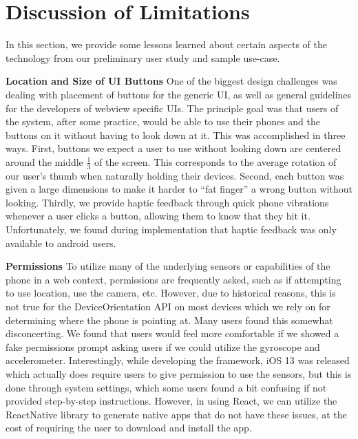 \section{Discussion of Limitations}\label{chap04:limitations}

In this section, we provide some lessons learned about certain
aspects of the technology from our preliminary user study and
sample use-case.

\textbf{Location and Size of UI Buttons} One of the biggest design challenges
was dealing with placement of
buttons for the generic UI, as well as general guidelines for the
developers of webview specific UIs. The principle goal was that
users of the system, after some practice, would be able to use
their phones and the buttons on it without having to look down
at it. This was accomplished in three ways. First, buttons we expect a
user to use without looking down are centered around the middle
$\frac{1}{3}$ of the screen. This corresponds to the average rotation
of our user's thumb when naturally holding their devices. Second,
each button was given a large dimensions to make it harder to ``fat
finger'' a wrong button without looking. Thirdly, we provide haptic
feedback through quick phone vibrations whenever a user clicks a
button, allowing them to know that they hit it. Unfortunately, we
found during implementation that haptic feedback was only available
to android users.

\textbf{Permissions} To utilize many of the underlying sensors or
capabilities of the phone in a web context, permissions are frequently
asked, such as if attempting to use location, use the camera, etc. However,
due to historical reasons, this is not true for the DeviceOrientation
API on most devices which we rely on for determining where the phone
is pointing at. Many users found this somewhat disconcerting. We
found that users would feel more comfortable if we showed a fake
permissions prompt asking users if we could utilize the gyroscope
and accelerometer. Interestingly, while developing the framework,
iOS 13 was released which actually does require users to give
permission to use the sensors, but this is done through system
settings, which some users found a bit confusing if not provided
step-by-step instructions. However, in using React, we can utilize
the ReactNative library to generate native apps that do not have
these issues, at the cost of requiring the user to download and install
the app.

